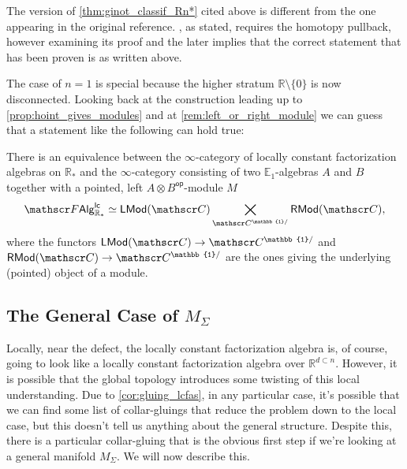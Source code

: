 \documentclass[../text]{subfiles}
\begin{document}
\begin{remark}
    The version of \cref{thm:ginot_classif_Rn*} cited above is different from the one appearing in the original reference. \cite[cor.8]{ginot2015}, as stated, requires the homotopy pullback, however examining its proof and the later \cite[cor.9]{ginot2015} implies that the correct statement that has been proven is as written above.
\end{remark}

\begin{remark}
    The case of $n=1$ is special because the higher stratum $\mathbb{R} \setminus \{0\}$ is now disconnected. Looking back at the construction leading up to \cref{prop:hoint_gives_modules} and at \cref{rem:left_or_right_module} we can guess that a statement like the following can hold true:
\end{remark}

\begin{proposition}
    There is an equivalence between the $\infty$-category of locally constant factorization algebras on $\mathbb{R}_*$ and the $\infty$-category consisting of two $\mathbb{E}_1$-algebras $A$ and $B$ together with a pointed, left $A \otimes B^\mathsf{op}$-module $M$
    \begin{equation}
        \lcfa_{\mathbb{R}_*} \simeq \mathsf{LMod} (\catC) \bigtimes_{\catC^{\mathbb{1}/}} \mathsf{RMod} (\catC),
    \end{equation}
    where the functors $\mathsf{LMod}(\catC) \rightarrow \catC^{\mathbb{1}/}$ and $\mathsf{RMod}(\catC) \rightarrow \catC^{\mathbb{1}/}$ are the ones giving the underlying (pointed) object of a module.
\end{proposition}




\subsection{The General Case of \texorpdfstring{$M_{\Sigma}$}{M Sigma}}

Locally, near the defect, the locally constant factorization algebra is, of course, going to look like a locally constant factorization algebra over $\mathbb{R}^{d \subset n}$. However, it is possible that the global topology introduces some twisting of this local understanding. Due to \cref{cor:gluing_lcfas}, in any particular case, it's possible that we can find some list of collar-gluings that reduce the problem down to the local case, but this doesn't tell us anything about the general structure. Despite this, there is a particular collar-gluing that is the obvious first step if we're looking at a general manifold $M_\Sigma$. We will now describe this.
\end{document}
